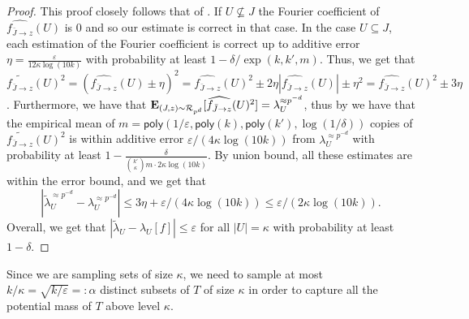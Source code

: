 \documentclass[10pt,a4paper]{article}
\providecommand{\poly}{\mathsf{poly}}
\theoremstyle{plain}
\theoremstyle{remark}
\theoremstyle{plain}
\providecommand{\E}{}
\renewcommand{\E}{\mathop{\bf E\/}}
\newcommand{\eps}{\varepsilon}
\renewcommand{\hat}{\widehat}
\renewcommand{\tilde}{\widetilde}
\newcommand{\calR}{\mathcal{R}}
\newcommand{\Restrictedf}{f_{\bar{J}\to z}}
\newcommand{\specialset}{T}
\newcommand{\fourierCutoff}{\kappa}
\newcommand{\branchProcessDepth}{\alpha}
\begin{document}
\begin{proof}
This proof closely follows that of .
If $U \not\subseteq J$ the Fourier coefficient of $\hat{\Restrictedf}(U)$ is $0$ and so our estimate is correct in that case. In the case $U \subseteq J$, each estimation of the Fourier coefficient is correct up to additive error $\eta = \frac{\eps}{12\fourierCutoff\log(10k)}$ with probability at least $1-\delta/\exp(k,k',m)$.
Thus, we get that $\tilde{\Restrictedf}(U)^2 = (\hat{\Restrictedf}(U) \pm \eta)^2 = \hat{\Restrictedf}(U)^2  \pm 2\eta|\hat{\Restrictedf}(U)| \pm \eta^2 = \hat{\Restrictedf}(U)^2 \pm 3\eta$.
Furthermore, we have that $\E_{(J,z)\sim \calR_{p^{d}}}[\hat{\Restrictedf}(U)^2] = \lambda_U^{\approx p^{-d}}$, thus by  we have that the empirical mean of $m = \poly(1/\eps,\poly(k), \poly(k'), \log(1/\delta))$ copies of  $\tilde{\Restrictedf}(U)^2$ is within additive error $\eps/(4\fourierCutoff\log(10k))$ from $\lambda_U^{\approx p^{-d}}$ with probability at least  $1-\frac{\delta}{\binom{k'}{\fourierCutoff}m\cdot 2\fourierCutoff\log(10k)}$. 
By union bound, all these estimates are within the error bound, and we get that
%
$$\left|\tilde{\lambda}_U^{\approx p^{-d}} - \lambda_U^{\approx p^{-d}}\right| \le 3\eta + \eps/(4 \fourierCutoff\log(10k)) \le \eps/(2\fourierCutoff\log(10k)).$$
Overall, we get that $|\tilde{\lambda}_U - \lambda_U[f]| \le \eps$ for all $|U| = \fourierCutoff$ with probability at least $1-\delta$.
\end{proof}

Since we are sampling sets of size $\fourierCutoff$, we need to sample at most $k/\fourierCutoff = \sqrt{k/\eps} =: \branchProcessDepth$ distinct subsets of $\specialset$ of size $\fourierCutoff$ in order to capture all the potential mass of $\specialset$ above level $\fourierCutoff$. 
\end{document}
